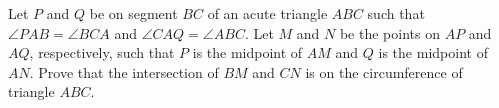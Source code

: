 Let 
$P$
 and 
$Q$
 be on segment 
$BC$
 of an acute triangle 
$ABC$
 such that 
$\angle PAB=\angle BCA$
 and 
$\angle CAQ=\angle ABC$.
 Let 
$M$
 and 
$N$
 be the points on 
$AP$
 and 
$AQ$, 
 respectively, such that 
$P$
 is the midpoint of 
$AM$
 and 
$Q$
 is the midpoint of 
$AN$.
 Prove that the intersection of 
$BM$
 and 
$CN$
 is on the circumference of triangle 
$ABC$.


